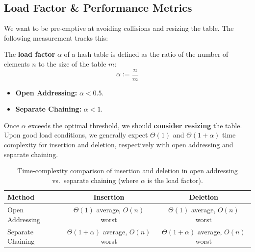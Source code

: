 \newpage

\subsection{Load Factor \& Performance Metrics}

\noindent
We want to be pre-emptive at avoiding collisions and resizing the table. The following measurement tracks this:

\begin{Def}

    \label{def:load_factor}

    The \textbf{load factor} \(\alpha\) of a hash table is defined as the ratio of the number of elements \(n\) to the size of the table \(m\):
    \[
        \alpha :=  \frac{n}{m}
    \]

    \begin{itemize}
        \item \textbf{Open Addressing:} $\alpha < 0.5$.
        \item \textbf{Separate Chaining:} $\alpha < 1$.
    \end{itemize}

    \noindent
    Once $\alpha$ exceeds the optimal threshold, we should \textbf{consider resizing} the table. Upon good load conditions, we
    generally expect $\Theta(1)$ and $\Theta(1 + \alpha)$ time complexity for insertion and deletion, respectively with open addressing and separate chaining.
\end{Def}

\begin{table}[ht!]
    \centering
    \begin{tabular}{l|c|c}
        \hline
        Method & Insertion & Deletion \\
        \hline
        Open Addressing       & \(\Theta (1)\) average, \(O(n)\) worst & \(\Theta (1)\) average, \(O(n)\) worst \\
        Separate Chaining     & \(\Theta(1 + \alpha)\) average, \(O(n)\) worst & \(\Theta(1 + \alpha)\) average, \(O(n)\) worst \\
        \hline
    \end{tabular}
    \caption{Time-complexity comparison of insertion and deletion in open addressing vs.\ separate chaining (where \(\alpha\) is the load factor).}
    \label{tab:hash_complexities}
\end{table}

